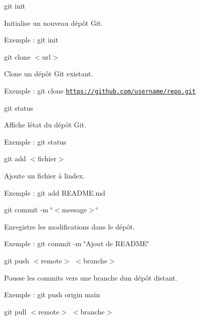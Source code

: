 \begin{DoxyEnumerate}
\item {\ttfamily git init}
\begin{DoxyItemize}
\item Initialise un nouveau dépôt Git.
\item Exemple \+: {\ttfamily git init}
\end{DoxyItemize}
\item {\ttfamily git clone $<$url$>$}
\begin{DoxyItemize}
\item Clone un dépôt Git existant.
\item Exemple \+: {\ttfamily git clone \href{https://github.com/username/repo.git}{\tt https\+://github.\+com/username/repo.\+git}}
\end{DoxyItemize}
\item {\ttfamily git status}
\begin{DoxyItemize}
\item Affiche l\textquotesingle{}état du dépôt Git.
\item Exemple \+: {\ttfamily git status}
\end{DoxyItemize}
\item {\ttfamily git add $<$fichier$>$}
\begin{DoxyItemize}
\item Ajoute un fichier à l\textquotesingle{}index.
\item Exemple \+: {\ttfamily git add R\+E\+A\+D\+M\+E.\+md}
\end{DoxyItemize}
\item {\ttfamily git commit -\/m \char`\"{}$<$message$>$\char`\"{}}
\begin{DoxyItemize}
\item Enregistre les modifications dans le dépôt.
\item Exemple \+: {\ttfamily git commit -\/m \char`\"{}\+Ajout de R\+E\+A\+D\+M\+E\char`\"{}}
\end{DoxyItemize}
\item {\ttfamily git push $<$remote$>$ $<$branche$>$}
\begin{DoxyItemize}
\item Pousse les commits vers une branche d\textquotesingle{}un dépôt distant.
\item Exemple \+: {\ttfamily git push origin main}
\end{DoxyItemize}
\item {\ttfamily git pull $<$remote$>$ $<$branche$>$}
\begin{DoxyItemize}

\end{DoxyItemize}
\end{DoxyEnumerate}
